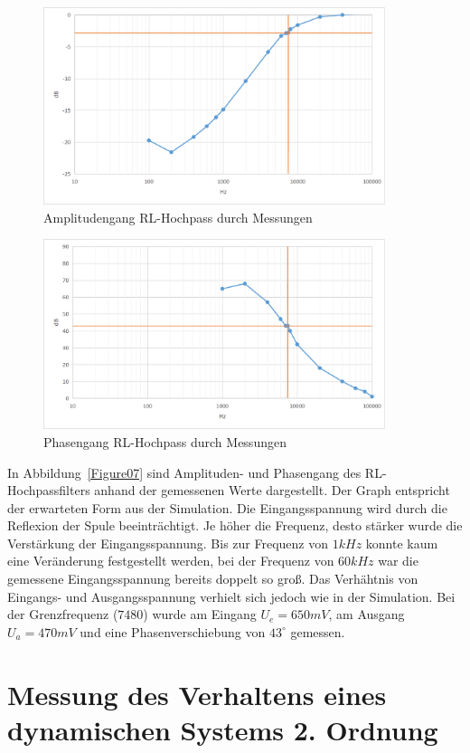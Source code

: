 \documentclass[12pt,a4paper,titlepage]{article}
\begin{document}
\begin{figure}[H]
  \centering
  \includegraphics[width=100mm]{amplitudengang_rl_hochpass.png}
  \caption{Amplitudengang RL-Hochpass durch Messungen}
  \label{Figure08}
\end{figure}
\begin{figure}[H]
  \centering
  \includegraphics[width=100mm]{phasengang_rl_hochpass.png}
  \caption{Phasengang RL-Hochpass durch Messungen}
  \label{Figure09}
\end{figure}
In Abbildung~\ref{Figure07} sind Amplituden- und Phasengang des RL-Hochpassfilters anhand der gemessenen Werte dargestellt. Der Graph entspricht der erwarteten Form aus der Simulation. Die Eingangsspannung wird durch die Reflexion der Spule beeintr\"achtigt. Je h\"oher die Frequenz, desto st\"arker wurde die Verst\"arkung der Eingangsspannung. Bis zur Frequenz von $1 kHz$ konnte kaum eine Ver\"anderung festgestellt werden, bei der Frequenz von $60 kHz$ war die gemessene Eingangsspannung bereits doppelt so gro\ss. Das Verh\"ahtnis von Eingangs- und Ausgangsspannung verhielt sich jedoch wie in der Simulation. Bei der Grenzfrequenz ($7480$) wurde am Eingang $U_e = 650mV$, am Ausgang $U_a = 470mV$ und eine Phasenverschiebung von $43^{\circ}$ gemessen.






\section{Messung des Verhaltens eines dynamischen Systems 2. Ordnung}
\end{document}
